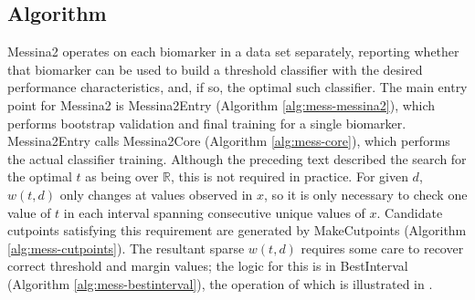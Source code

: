 \documentclass[dissertation.tex]{subfiles}
\begin{document}
\subsection{Algorithm}
Messina2 operates on each biomarker in a data set separately, reporting whether that biomarker can be used to build a threshold classifier with the desired performance characteristics, and, if so, the optimal such classifier.  The main entry point for Messina2 is Messina2Entry (Algorithm \ref{alg:mess-messina2}), which performs bootstrap validation and final training for a single biomarker.  Messina2Entry calls Messina2Core (Algorithm \ref{alg:mess-core}), which performs the actual classifier training.  Although the preceding text described the search for the optimal $t$ as being over $\mathbb{R}$, this is not required in practice.  For given $d$, $w(t,d)$ only changes at values observed in $x$, so it is only necessary to check one value of $t$ in each interval spanning consecutive unique values of $x$.  Candidate cutpoints satisfying this requirement are generated by MakeCutpoints (Algorithm \ref{alg:mess-cutpoints}).  The resultant sparse $w(t,d)$ requires some care to recover correct threshold and margin values; the logic for this is in BestInterval (Algorithm \ref{alg:mess-bestinterval}), the operation of which is illustrated in .
\end{document}
